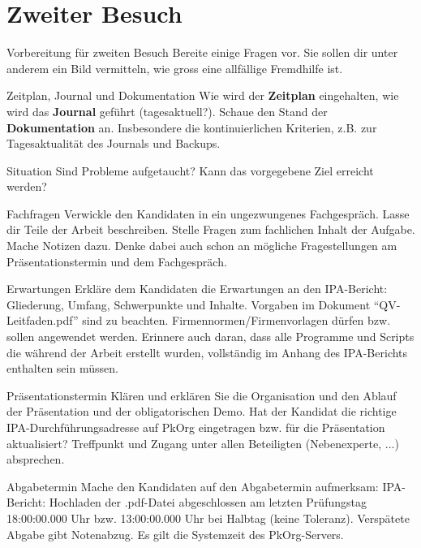 \section{Zweiter Besuch}
\begin{taskitem}{Vorbereitung für zweiten Besuch}
  Bereite einige Fragen vor. Sie sollen dir unter anderem ein Bild vermitteln, wie gross eine allfällige Fremdhilfe ist.
\end{taskitem}
\begin{taskitem}{Zeitplan, Journal und Dokumentation}
  Wie wird der \textbf{Zeitplan} eingehalten, wie wird das \textbf{Journal} geführt (tagesaktuell?). Schaue den Stand der \textbf{Dokumentation} an. Insbesondere die kontinuierlichen Kriterien, z.B. zur Tagesaktualität des Journals und Backups.
\end{taskitem}
\begin{taskitem}{Situation}
  Sind Probleme aufgetaucht? Kann das vorgegebene Ziel erreicht werden?
\end{taskitem}
\begin{taskitem}{Fachfragen}
  Verwickle den Kandidaten in ein ungezwungenes Fachgespräch. Lasse dir Teile der Arbeit beschreiben. Stelle Fragen zum fachlichen Inhalt der Aufgabe. Mache Notizen dazu. Denke dabei auch schon an mögliche Fragestellungen am Präsentationstermin und dem Fachgespräch.
\end{taskitem}
\begin{taskitem}{Erwartungen}
  Erkläre dem Kandidaten die Erwartungen an den IPA-Bericht: Gliederung, Umfang, Schwerpunkte und Inhalte. Vorgaben im Dokument \enquote{QV-Leitfaden.pdf} sind zu beachten. Firmennormen/Firmenvorlagen dürfen bzw. sollen angewendet werden. Erinnere auch daran, dass alle Programme und Scripts die während der Arbeit erstellt wurden, vollständig im Anhang des IPA-Berichts enthalten sein müssen.
\end{taskitem}
\begin{taskitem}{Präsentationstermin}
  Klären und erklären Sie die Organisation und den Ablauf der Präsentation und der obligatorischen Demo. Hat der Kandidat die richtige IPA-Durchführungsadresse auf PkOrg eingetragen bzw. für die Präsentation aktualisiert? Treffpunkt und Zugang unter allen Beteiligten (Nebenexperte, ...) absprechen.
\end{taskitem}
\begin{taskitem}{Abgabetermin}
  Mache den Kandidaten auf den Abgabetermin aufmerksam: IPA-Bericht: Hochladen der .pdf-Datei abgeschlossen am letzten Prüfungstag 18:00:00.000 Uhr bzw. 13:00:00.000 Uhr bei Halbtag (keine Toleranz). Verspätete Abgabe gibt Notenabzug. Es gilt die Systemzeit des PkOrg-Servers.
\end{taskitem}
